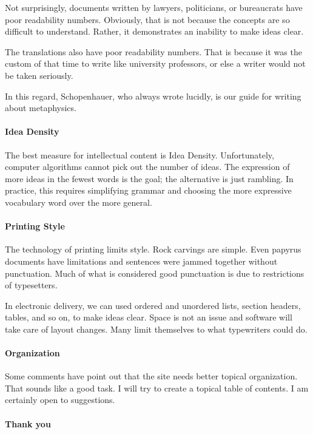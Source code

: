 Not surprisingly, documents written by lawyers, politicians, or bureaucrats have poor readability numbers. Obviously, that is not because the concepts are so difficult to understand. Rather, it demonstrates an inability to make ideas clear.

The translations also have poor readability numbers. That is because it was the custom of that time to write like university professors, or else a writer would not be taken seriously.

In this regard, Schopenhauer, who always wrote lucidly, is our guide for writing about metaphysics.

\paragraph{Idea Density}


The best measure for intellectual content is Idea Density. Unfortunately, computer algorithms cannot pick out the number of ideas. The expression of more ideas in the fewest words is the goal; the alternative is just rambling. In practice, this requires simplifying grammar and choosing the more expressive vocabulary word over the more general.

\paragraph{Printing Style}


The technology of printing limits style. Rock carvings are simple. Even papyrus documents have limitations and sentences were jammed together without punctuation. Much of what is considered good punctuation is due to restrictions of typesetters.

In electronic delivery, we can used ordered and unordered lists, section headers, tables, and so on, to make ideas clear. Space is not an issue and software will take care of layout changes. Many limit themselves to what typewriters could do.

\paragraph{Organization}


Some comments have point out that the site needs better topical organization. That sounds like a good task. I will try to create a topical table of contents. I am certainly open to suggestions.

\paragraph{Thank you}



